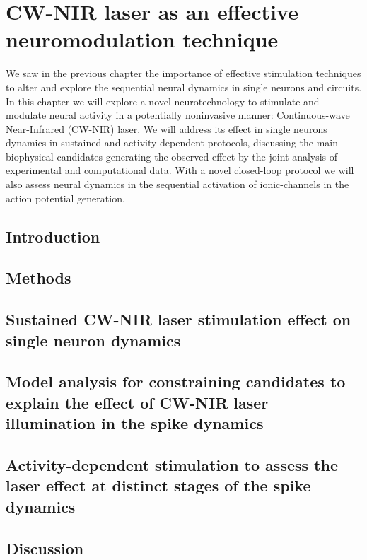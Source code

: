 \chapter{CW-NIR laser as an effective neuromodulation technique}
\label{c-laser}

We saw in the previous chapter the importance of effective stimulation techniques to alter and explore the sequential neural dynamics in single neurons and circuits. In this chapter we will explore a novel neurotechnology to stimulate and modulate neural activity in a potentially noninvasive manner: Continuous-wave Near-Infrared (CW-NIR) laser. We will address its effect in single neurons dynamics in sustained and activity-dependent protocols, discussing the main biophysical candidates generating the  observed effect by the joint analysis of experimental and computational data. With a novel closed-loop protocol we will also assess  neural dynamics in the sequential activation of ionic-channels in the action potential generation. 

\section{Introduction}
\label{sect:intro} 



\section{Methods}



\section{Sustained CW-NIR laser stimulation effect on single neuron dynamics}
\label{sec:sustained effect}


\section{Model analysis for constraining candidates to explain the effect of CW-NIR laser illumination in the spike dynamics}
\label{sec:laser models}


\section{Activity-dependent stimulation to assess the laser effect at distinct stages of the spike dynamics} 
\label{sec:activity dependent}



\section{Discussion}
